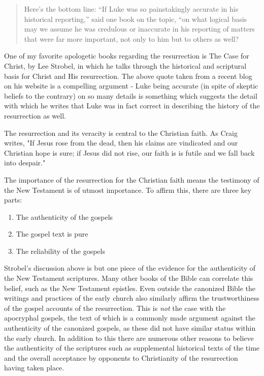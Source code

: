 \documentclass[12pt]{turabian-researchpaper}
\begin{document}
\begin{quotation}
\noindent Here’s the bottom line: “If Luke was so painstakingly accurate in his historical reporting,” said one book on the topic, “on what logical basis may we assume he was credulous or inaccurate in his reporting of matters that were far more important, not only to him but to others as well?\autocite{strobel2017}

\end{quotation}
One of my favorite apologetic books regarding the resurrection is The Case for Christ, by Lee Strobel, in which he talks through the historical and scriptural basis for Christ and His resurrection.\autocite{church2009case} The above quote taken from a recent blog on his website is a compelling argument - Luke being accurate (in spite of skeptic beliefs to the contrary) on so many details is something which suggests the detail with which he writes that Luke was in fact correct in describing the history of the resurrection as well.

The resurrection and its veracity is central to the Christian faith. As Craig writes, "If Jesus rose from the dead, then his claims are vindicated and our Christian hope is sure; if Jesus did not rise, our faith is is futile and we fall back into despair."\autocite[pg.333]{craig2008reasonable} 

The importance of the resurrection for the Christian faith means the testimony of the New Testament is of utmost importance. To affirm this, there are three key parts\autocite[pg.336]{craig2008reasonable}:

\begin{enumerate}
\item The authenticity of the gospels
\item The gospel text is pure
\item The reliability of the gospels
\end{enumerate} 

Strobel's discussion above is but one piece of the evidence for the authenticity of the New Testament scriptures. Many other books of the Bible can correlate this belief, such as the New Testament epistles. Even outside the canonized Bible the writings and practices of the early church also similarly affirm the trustworthiness of the gospel accounts of the resurrection. This is \textit{not} the case with the apocryphal gospels, the text of which is a commonly made argument against the authenticity of the canonized gospels, as these did not have similar status within the early church. In addition to  this there are numerous other reasons to believe the authenticity of the scriptures such as supplemental historical texts of the time and  the overall acceptance by opponents to Christianity of the resurrection having taken place.
\end{document}
